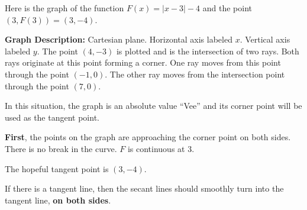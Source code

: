 \documentclass{ximera}
\begin{document}
Here is the graph of the function $F(x) = | x - 3 | - 4$ and the point $(3, F(3))= (3, -4)$. 

\begin{image}
\end{image}

\textcolor{gray!90}{\textbf{Graph Description:} Cartesian plane. Horizontal axis labeled $x$. Vertical axis labeled $y$. The point $(4,-3)$ is plotted and is the intersection of two rays.  Both rays originate at this point forming a corner.  One ray moves from this point through the point $(-1,0)$.  The other ray moves from the intersection point through the point $(7,0)$.}



In this situation, the graph is an absolute value ``Vee'' and its corner point will be used as the tangent point. 


\textbf{First}, the points on the graph are approaching the corner point on both sides.  There is no break in the curve. $F$ is continuous at $3$.


The hopeful tangent point is $(3, -4)$. 


If there is a tangent line, then the secant lines should smoothly turn into the tangent line, \textbf{on both sides}.  
\end{document}

